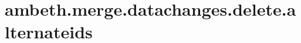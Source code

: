 \section{ambeth.merge.datachanges.delete.alternateids}
\label{configuration:AmbethMergeDatachangesDeleteAlternateids}
\AvailableInJavaOnly{\TODO}